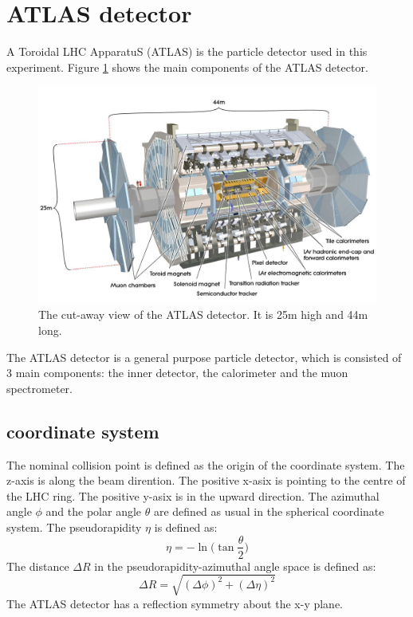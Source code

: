 \section{ATLAS detector}
\label{sec:detector_ATLAS}

A Toroidal LHC ApparatuS (ATLAS) is the particle detector used in this experiment.
Figure \ref{fig:detector_ATLAS} shows the main components of the ATLAS detector.
\begin{figure}
\centering
\includegraphics[width=\textwidth]{data/photo/ATLAS.jpg}
\caption{The cut-away view of the ATLAS detector. It is 25m high and 44m long. \cite{ATLAS_photo}}
\label{fig:detector_ATLAS}
\end{figure}
The ATLAS detector is a general purpose particle detector, which is consisted of 3 main components: the inner detector, the calorimeter and the muon spectrometer. \cite{ATLAS_doc}

\subsection{coordinate system}
The nominal collision point is defined as the origin of the coordinate system.
The z-axis is along the beam dirention.
The positive x-asix is pointing to the centre of the LHC ring.
The positive y-asix is in the upward direction.
The azimuthal angle $\phi$ and the polar angle $\theta$ are defined as usual in the spherical coordinate system.
The pseudorapidity $\eta$ is defined as:
\begin{equation}
\eta = - \ln \Big( \tan \frac{\theta}{2} \Big)
\end{equation}
The distance $\Delta R$ in the pseudorapidity-azimuthal angle space is defined as:
\begin{equation}
\Delta R = \sqrt{(\Delta \phi) ^2 + (\Delta \eta) ^2}
\end{equation}
The ATLAS detector has a reflection symmetry about the x-y plane.

